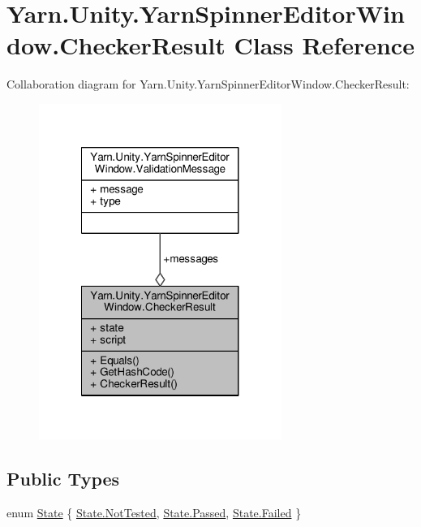 \hypertarget{a00027}{\section{Yarn.\-Unity.\-Yarn\-Spinner\-Editor\-Window.\-Checker\-Result Class Reference}
\label{a00027}
}


Collaboration diagram for Yarn.\-Unity.\-Yarn\-Spinner\-Editor\-Window.\-Checker\-Result\-:
\nopagebreak
\begin{figure}[H]
\begin{center}
\leavevmode
\includegraphics[width=224pt]{d8/dcb/a00706}
\end{center}
\end{figure}
\subsection*{Public Types}
\begin{DoxyCompactItemize}
\item 
enum \hyperlink{a00027_ab24848d7951ce44eb3c7768c6ee10385}{State} \{ \hyperlink{a00027_ab24848d7951ce44eb3c7768c6ee10385a0197c47523ba5a2bdfef705786687de5}{State.\-Not\-Tested}, 
\hyperlink{a00027_ab24848d7951ce44eb3c7768c6ee10385aa0d0628f6b4e4d78d2ffef4d4d1c4b15}{State.\-Passed}, 
\hyperlink{a00027_ab24848d7951ce44eb3c7768c6ee10385ad7c8c85bf79bbe1b7188497c32c3b0ca}{State.\-Failed}
 \}
\end{DoxyCompactItemize}

